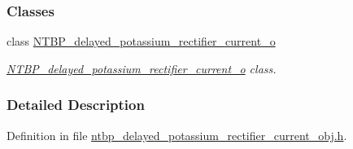 \subsubsection*{Classes}
\begin{DoxyCompactItemize}
\item 
class \hyperlink{class_n_t_b_p__delayed__potassium__rectifier__current__o}{NTBP\_\-delayed\_\-potassium\_\-rectifier\_\-current\_\-o}
\begin{DoxyCompactList}\small\item\em \hyperlink{class_n_t_b_p__delayed__potassium__rectifier__current__o}{NTBP\_\-delayed\_\-potassium\_\-rectifier\_\-current\_\-o} class. \item\end{DoxyCompactList}\end{DoxyCompactItemize}


\subsubsection{Detailed Description}


Definition in file \hyperlink{ntbp__delayed__potassium__rectifier__current__obj_8h_source}{ntbp\_\-delayed\_\-potassium\_\-rectifier\_\-current\_\-obj.h}.

